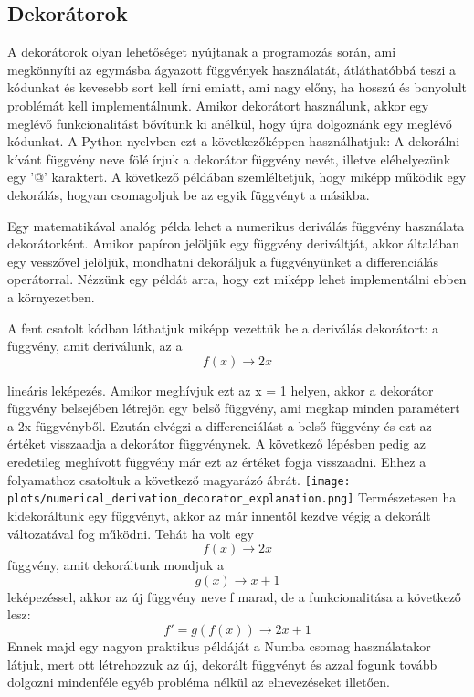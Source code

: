 \documentclass{article}
\theoremstyle{definition}
\theoremstyle{theorem}
\begin{document}
\subsection{Dekorátorok}
A dekorátorok olyan lehetőséget nyújtanak a programozás során, ami megkönnyíti az egymásba ágyazott függvények használatát, átláthatóbbá teszi a kódunkat és kevesebb sort kell írni emiatt, ami nagy előny, ha hosszú és bonyolult problémát kell implementálnunk. Amikor dekorátort használunk, akkor egy meglévő funkcionalitást bővítünk ki anélkül, hogy újra dolgoznánk egy meglévő kódunkat. A Python nyelvben ezt a következőképpen használhatjuk: A dekorálni kívánt függvény neve fölé írjuk a dekorátor függvény nevét, illetve eléhelyezünk egy '@' karaktert. A következő példában szemléltetjük, hogy miképp működik egy dekorálás, hogyan csomagoljuk be az egyik függvényt a másikba.

\pagebreak
Egy matematikával analóg példa lehet a numerikus deriválás függvény használata dekorátorként. Amikor papíron jelöljük egy függvény deriváltját, akkor általában egy vesszővel jelöljük, mondhatni dekoráljuk a függvényünket a differenciálás operátorral. Nézzünk egy példát arra, hogy ezt miképp lehet implementálni ebben a környezetben.

A fent csatolt kódban láthatjuk miképp vezettük be a deriválás dekorátort: a függvény, amit deriválunk, az a
\begin{equation*}
    f(x) \rightarrow 2x
\end{equation*}

lineáris leképezés. Amikor meghívjuk ezt az x = 1 helyen, akkor a dekorátor függvény belsejében létrejön egy belső függvény, ami megkap minden paramétert a 2x függvényből. Ezután elvégzi a differenciálást a belső függvény és ezt az értéket visszaadja a dekorátor függvénynek. A következő lépésben pedig az eredetileg meghívott függvény már ezt az értéket fogja visszaadni. Ehhez a folyamathoz csatoltuk a következő magyarázó ábrát. \newline
\texttt{[image: plots/numerical\_derivation\_decorator\_explanation.png]}
Természetesen ha kidekoráltunk egy függvényt, akkor az már innentől kezdve végig a dekorált változatával fog működni. Tehát ha volt egy
\begin{equation*}
    f(x) \rightarrow 2x
\end{equation*}
függvény, amit dekoráltunk mondjuk a
\begin{equation*}
    g(x) \rightarrow x + 1
\end{equation*}
leképezéssel, akkor az új függvény neve f marad, de a funkcionalitása a következő lesz:
\begin{equation*}
    f' = g(f(x)) \rightarrow 2x + 1
\end{equation*}
Ennek majd egy nagyon praktikus példáját a Numba csomag használatakor látjuk, mert ott létrehozzuk az új, dekorált függvényt és azzal fogunk tovább dolgozni mindenféle egyéb probléma nélkül az elnevezéseket illetően.
\end{document}
